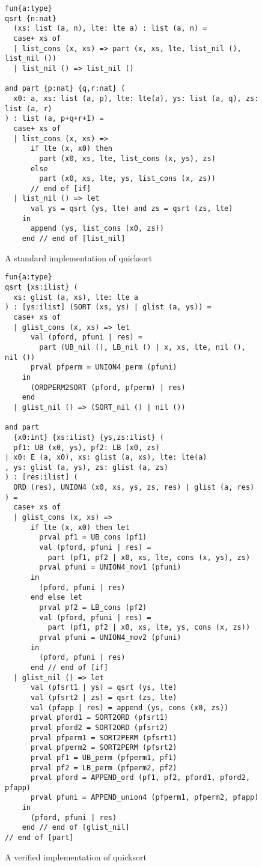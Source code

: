 \documentclass{llncs}
\begin{document}
\def\pLB{{\bf LB}}
\def\pUB{{\bf UB}}
\def\pUNION{{\bf UNION4}}
\def\pAPPEND{{\bf APPEND}}
\def\mset#1{|#1|}

\begin{figure}[thp]
\begin{verbatim}
fun{a:type}
qsrt {n:nat}
  (xs: list (a, n), lte: lte a) : list (a, n) =
  case+ xs of
  | list_cons (x, xs) => part (x, xs, lte, list_nil (), list_nil ())
  | list_nil () => list_nil ()

and part {p:nat} {q,r:nat} (
  x0: a, xs: list (a, p), lte: lte(a), ys: list (a, q), zs: list (a, r)
) : list (a, p+q+r+1) =
  case+ xs of
  | list_cons (x, xs) =>
      if lte (x, x0) then
        part (x0, xs, lte, list_cons (x, ys), zs)
      else
        part (x0, xs, lte, ys, list_cons (x, zs))
      // end of [if]        
  | list_nil () => let
      val ys = qsrt (ys, lte) and zs = qsrt (zs, lte)
    in
      append (ys, list_cons (x0, zs))
    end // end of [list_nil]
\end{verbatim}
\caption{A standard implementation of quicksort}
\label{figure:standard_quicksort}
\end{figure}

\begin{figure}[thp]
\begin{verbatim}
fun{a:type}
qsrt {xs:ilist} (
  xs: glist (a, xs), lte: lte a
) : [ys:ilist] (SORT (xs, ys) | glist (a, ys)) =
  case+ xs of
  | glist_cons (x, xs) => let
      val (pford, pfuni | res) =
        part (UB_nil (), LB_nil () | x, xs, lte, nil (), nil ())
      prval pfperm = UNION4_perm (pfuni)
    in
      (ORDPERM2SORT (pford, pfperm) | res)
    end
  | glist_nil () => (SORT_nil () | nil ())

and part
  {x0:int} {xs:ilist} {ys,zs:ilist} (
  pf1: UB (x0, ys), pf2: LB (x0, zs)
| x0: E (a, x0), xs: glist (a, xs), lte: lte(a)
, ys: glist (a, ys), zs: glist (a, zs)
) : [res:ilist] (
  ORD (res), UNION4 (x0, xs, ys, zs, res) | glist (a, res)
) =
  case+ xs of
  | glist_cons (x, xs) =>
      if lte (x, x0) then let
        prval pf1 = UB_cons (pf1)
        val (pford, pfuni | res) =
          part (pf1, pf2 | x0, xs, lte, cons (x, ys), zs)
        prval pfuni = UNION4_mov1 (pfuni)
      in
        (pford, pfuni | res)
      end else let
        prval pf2 = LB_cons (pf2)
        val (pford, pfuni | res) =
          part (pf1, pf2 | x0, xs, lte, ys, cons (x, zs))
        prval pfuni = UNION4_mov2 (pfuni)
      in
        (pford, pfuni | res)
      end // end of [if]        
  | glist_nil () => let
      val (pfsrt1 | ys) = qsrt (ys, lte)
      val (pfsrt2 | zs) = qsrt (zs, lte)
      val (pfapp | res) = append (ys, cons (x0, zs))
      prval pford1 = SORT2ORD (pfsrt1)
      prval pford2 = SORT2ORD (pfsrt2)
      prval pfperm1 = SORT2PERM (pfsrt1)
      prval pfperm2 = SORT2PERM (pfsrt2)
      prval pf1 = UB_perm (pfperm1, pf1)
      prval pf2 = LB_perm (pfperm2, pf2)
      prval pford = APPEND_ord (pf1, pf2, pford1, pford2, pfapp)
      prval pfuni = APPEND_union4 (pfperm1, pfperm2, pfapp)
    in
      (pford, pfuni | res)
    end // end of [glist_nil]
// end of [part]
\end{verbatim}
\caption{A verified implementation of quicksort}
\label{figure:verified_quicksort}
\end{figure}
\end{document}
